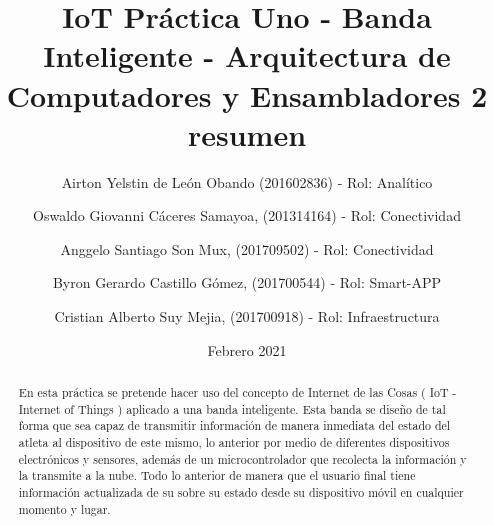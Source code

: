 \documentclass[osajnl,twocolumn,showpacs,superscriptaddress,10pt]{revtex4-1}
\begin{document}

\title{\Huge IoT Práctica Uno -  Banda Inteligente - Arquitectura de Computadores y Ensambladores 2 }

\author{\newline Airton Yelstin de León Obando (201602836) - Rol: Analítico}
%

\author{\newline Oswaldo Giovanni Cáceres Samayoa, (201314164) - Rol: Conectividad}%
%
\author{\newline Anggelo Santiago Son Mux, (201709502) - Rol: Conectividad}%
%
\author{\newline Byron Gerardo Castillo Gómez, (201700544) - Rol: Smart-APP}%
%
\author{\newline Cristian Alberto Suy Mejia, (201700918) - Rol: Infraestructura}%
%
\date{Febrero 2021}



\begin{abstract}
\title {resumen}
En esta pr\'actica se pretende hacer uso del concepto de Internet de las Cosas ( IoT - Internet of Things ) aplicado a una banda inteligente. Esta banda se diseño de tal forma que sea capaz de transmitir informaci\'on de manera inmediata del estado del atleta al dispositivo de este mismo, lo anterior por medio de diferentes dispositivos electrónicos y sensores, adem\'as de un microcontrolador que recolecta la informaci\'on y la transmite a la nube. Todo lo anterior de manera que el usuario final tiene informaci\'on actualizada de su sobre su estado desde su dispositivo m\'ovil en cualquier momento y lugar.
\end{abstract}
\maketitle{}
\end{document}
